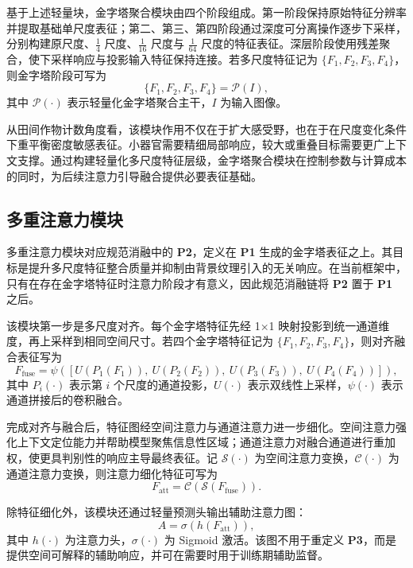 \documentclass[a4paper,fleqn]{cas-sc}
\begin{document}
基于上述轻量块，金字塔聚合模块由四个阶段组成。第一阶段保持原始特征分辨率并提取基础单尺度表征；第二、第三、第四阶段通过深度可分离操作逐步下采样，分别构建原尺度、$\frac{1}{4}$ 尺度、$\frac{1}{16}$ 尺度与 $\frac{1}{64}$ 尺度的特征表征。深层阶段使用残差聚合，使下采样响应与投影输入特征保持连接。若多尺度特征记为 $\{F_1, F_2, F_3, F_4\}$，则金字塔阶段可写为
\begin{equation}
    \{F_1, F_2, F_3, F_4\} = \mathcal{P}(I),
\end{equation}
其中 $\mathcal{P}(\cdot)$ 表示轻量化金字塔聚合主干，$I$ 为输入图像。

从田间作物计数角度看，该模块作用不仅在于扩大感受野，也在于在尺度变化条件下重平衡密度敏感表征。小器官需要精细局部响应，较大或重叠目标需要更广上下文支撑。通过构建轻量化多尺度特征层级，金字塔聚合模块在控制参数与计算成本的同时，为后续注意力引导融合提供必要表征基础。

\subsection{多重注意力模块}

多重注意力模块对应规范消融中的 \textbf{P2}，定义在 \textbf{P1} 生成的金字塔表征之上。其目标是提升多尺度特征整合质量并抑制由背景纹理引入的无关响应。在当前框架中，只有在存在金字塔特征时注意力阶段才有意义，因此规范消融链将 \textbf{P2} 置于 \textbf{P1} 之后。

该模块第一步是多尺度对齐。每个金字塔特征先经 1×1 映射投影到统一通道维度，再上采样到相同空间尺寸。若四个金字塔特征记为 $\{F_1, F_2, F_3, F_4\}$，则对齐融合表征写为
\begin{equation}
    F_{\mathrm{fuse}} = \psi\left([U(P_1(F_1)),\ U(P_2(F_2)),\ U(P_3(F_3)),\ U(P_4(F_4))]\right),
\end{equation}
其中 $P_i(\cdot)$ 表示第 $i$ 个尺度的通道投影，$U(\cdot)$ 表示双线性上采样，$\psi(\cdot)$ 表示通道拼接后的卷积融合。

完成对齐与融合后，特征图经空间注意力与通道注意力进一步细化。空间注意力强化上下文定位能力并帮助模型聚焦信息性区域；通道注意力对融合通道进行重加权，使更具判别性的响应主导最终表征。记 $\mathcal{S}(\cdot)$ 为空间注意力变换，$\mathcal{C}(\cdot)$ 为通道注意力变换，则注意力细化特征可写为
\begin{equation}
    F_{\mathrm{att}} = \mathcal{C}(\mathcal{S}(F_{\mathrm{fuse}})).
\end{equation}

除特征细化外，该模块还通过轻量预测头输出辅助注意力图：
\begin{equation}
    A = \sigma(h(F_{\mathrm{att}})),
\end{equation}
其中 $h(\cdot)$ 为注意力头，$\sigma(\cdot)$ 为 Sigmoid 激活。该图不用于重定义 \textbf{P3}，而是提供空间可解释的辅助响应，并可在需要时用于训练期辅助监督。
\end{document}
